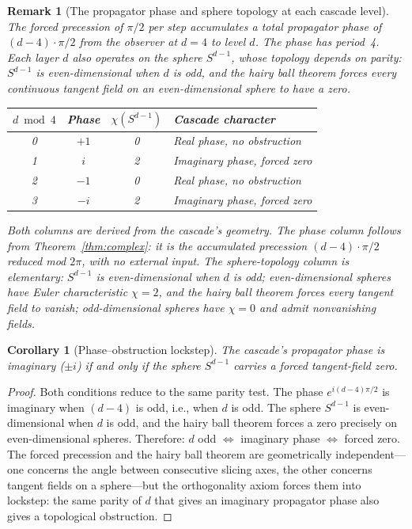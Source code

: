\documentclass[12pt,a4paper]{article}
\newtheorem{corollary}[theorem]{Corollary}
\newtheorem{remark}[theorem]{Remark}
\begin{document}
\begin{remark}[The propagator phase and sphere topology at each cascade level]\label{rem:bott-phases}
The forced precession of $\pi/2$ per step accumulates a total propagator phase of
$(d-4)\cdot\pi/2$ from the observer at $d=4$ to level $d$. The phase has period~4. Each
layer $d$ also operates on the sphere $S^{d-1}$, whose topology depends on parity: $S^{d-1}$
is even-dimensional when $d$ is odd, and the hairy ball theorem forces every continuous
tangent field on an even-dimensional sphere to have a zero.
\begin{center}
\begin{tabular}{cccl}
\toprule
$d\bmod 4$ & Phase & $\chi(S^{d-1})$ & Cascade character \\
\midrule
0 & $+1$ & 0 & Real phase, no obstruction \\
1 & $i$  & 2 & Imaginary phase, forced zero \\
2 & $-1$ & 0 & Real phase, no obstruction \\
3 & $-i$ & 2 & Imaginary phase, forced zero \\
\bottomrule
\end{tabular}
\end{center}
Both columns are derived from the cascade's geometry. The phase column follows from
Theorem~\ref{thm:complex}: it is the accumulated precession $(d-4)\cdot\pi/2$ reduced
mod $2\pi$, with no external input. The sphere-topology column is elementary: $S^{d-1}$
is even-dimensional when $d$ is odd; even-dimensional spheres have Euler characteristic
$\chi = 2$, and the hairy ball theorem forces every tangent field to vanish; odd-dimensional
spheres have $\chi = 0$ and admit nonvanishing fields.
\end{remark}

\begin{corollary}[Phase--obstruction lockstep]\label{cor:lockstep}
The cascade's propagator phase is imaginary ($\pm i$) if and only if the sphere $S^{d-1}$
carries a forced tangent-field zero.
\end{corollary}
\begin{proof}
Both conditions reduce to the same parity test. The phase
$e^{i(d-4)\pi/2}$ is imaginary when $(d-4)$ is odd, i.e., when $d$ is odd. The sphere
$S^{d-1}$ is even-dimensional when $d$ is odd, and the hairy ball theorem forces a zero
precisely on even-dimensional spheres. Therefore: $d$ odd $\Leftrightarrow$ imaginary phase
$\Leftrightarrow$ forced zero. The forced precession and the hairy ball theorem are
geometrically independent---one concerns the angle between consecutive slicing axes, the
other concerns tangent fields on a sphere---but the orthogonality axiom forces them into
lockstep: the same parity of $d$ that gives an imaginary propagator phase also gives a
topological obstruction.
\end{proof}
\end{document}
